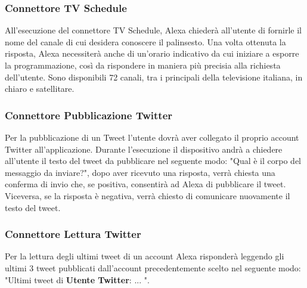 \subsubsection{Connettore TV Schedule}
All'esecuzione del connettore TV Schedule, Alexa chiederà all'utente di fornirle il nome del canale di cui desidera conoscere il palinsesto. Una volta ottenuta la risposta, Alexa necessiterà anche di un'orario indicativo da cui iniziare a esporre la programmazione, così da rispondere in maniera più precisia alla richiesta dell'utente.
Sono disponibili 72 canali, tra i principali della televisione italiana, in chiaro e satellitare.
\subsubsection{Connettore Pubblicazione Twitter}
Per la pubblicazione di un Tweet l'utente dovrà aver collegato il proprio account Twitter all'applicazione.
Durante l'esecuzione il dispositivo andrà a chiedere all'utente il testo del tweet da pubblicare nel seguente modo: "Qual è il corpo del messaggio da inviare?", dopo aver ricevuto una risposta, verrà chiesta una conferma di invio che, se positiva, consentirà ad Alexa di pubblicare il tweet. Viceversa, se la risposta è negativa, verrà chiesto di comunicare nuovamente il testo del tweet.
\subsubsection{Connettore Lettura Twitter}
Per la lettura degli ultimi tweet di un account Alexa risponderà leggendo gli ultimi 3 tweet pubblicati dall'account precedentemente scelto nel seguente modo: "Ultimi tweet di \textbf{Utente Twitter}: ... ".
